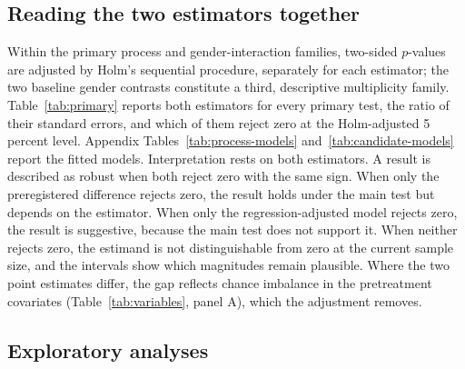 \documentclass[11pt]{article}\usepackage[]{graphicx}\usepackage[]{xcolor}
\begin{document}
\subsection{Reading the two estimators together}

Within the primary process and gender-interaction families, two-sided $p$-values are adjusted by Holm's sequential procedure, separately for each estimator; the two baseline gender contrasts constitute a third, descriptive multiplicity family. Table~\ref{tab:primary} reports both estimators for every primary test, the ratio of their standard errors, and which of them reject zero at the Holm-adjusted 5 percent level. Appendix Tables~\ref{tab:process-models} and~\ref{tab:candidate-models} report the fitted models. Interpretation rests on both estimators. A result is described as robust when both reject zero with the same sign. When only the preregistered difference rejects zero, the result holds under the main test but depends on the estimator. When only the regression-adjusted model rejects zero, the result is suggestive, because the main test does not support it. When neither rejects zero, the estimand is not distinguishable from zero at the current sample size, and the intervals show which magnitudes remain plausible. Where the two point estimates differ, the gap reflects chance imbalance in the pretreatment covariates (Table~\ref{tab:variables}, panel A), which the adjustment removes.

\subsection{Exploratory analyses}
\end{document}

